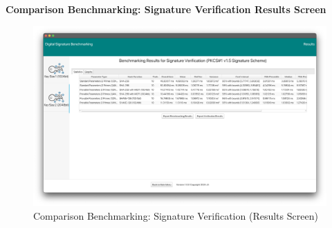 \documentclass[]{final_report}
\theoremstyle{definition}
\begin{document}

\newpage
\textbf{Comparison Benchmarking: Signature Verification Results Screen}

\begin{figure}[H]
    \centering
    \includegraphics[scale= 0.325]{main_pictures/ui/verifying/verifying6.png}
    \caption{Comparison Benchmarking: Signature Verification (Results Screen)}
\end{figure}
\end{document}
